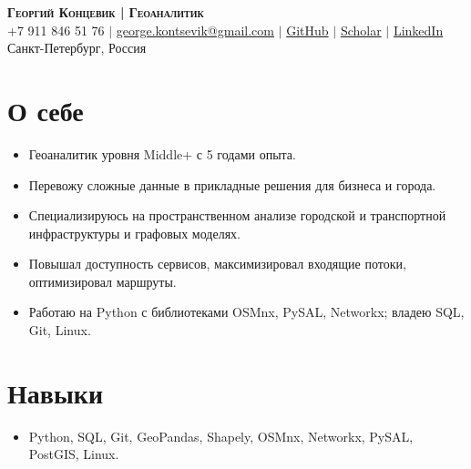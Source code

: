 \documentclass[letterpaper,11pt]{article}
\newcommand{\resumeSubHeadingListStart}{\begin{itemize}[leftmargin=0.15in, label={}, topsep=0pt, itemsep=0pt, parsep=0pt, partopsep=0pt]}
\newcommand{\resumeSubHeadingListEnd}{\end{itemize}}
\newcommand{\resumeBulletListStart}{\begin{itemize}[leftmargin=0.22in, label={--}, topsep=2pt, itemsep=2pt, parsep=0pt, partopsep=0pt]}
\newcommand{\resumeBulletListEnd}{\end{itemize}}
\begin{document}

\begin{center}
    \textbf{\scshape Георгий Концевик | Геоаналитик} \\ \vspace{3pt}
    \small
    \hspace{.5pt} {+7 911 846 51 76}
    $|$
    \hspace{.5pt} \href{mailto:george.kontsevik@gmail.com}{george.kontsevik@gmail.com}
    $|$
    \hspace{.5pt} \href{https://github.com/GeorgeKontsevik}{GitHub}
    $|$
    \hspace{.5pt} \href{https://scholar.google.com/citations?user=S--bTg8AAAAJ&hl=ru}{Scholar}
    $|$
    \hspace{.5pt} \href{https://www.linkedin.com/in/george-kontsevik/}{LinkedIn}
    \\ \vspace{3pt}
    \hspace{.5pt} {Санкт-Петербург, Россия}
\end{center}



\section{О себе}
  \vspace{2pt}
  \resumeBulletListStart
    \item Геоаналитик уровня Middle+ с 5 годами опыта.
    \item Перевожу сложные данные в прикладные решения для бизнеса и города.
    \item Специализируюсь на пространственном анализе городской и транспортной инфраструктуры и графовых моделях.
    \item Повышал доступность сервисов, максимизировал входящие потоки, оптимизировал маршруты.
    \item Работаю на Python с библиотеками OSMnx, PySAL, Networkx; владею SQL, Git, Linux.
  \resumeBulletListEnd




\section{Навыки}
  \vspace{2pt}
  \resumeSubHeadingListStart
    \item Python, SQL, Git, GeoPandas, Shapely, OSMnx, Networkx, PySAL, PostGIS, Linux.
  \resumeSubHeadingListEnd
\end{document}
